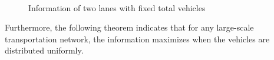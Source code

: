 \documentclass[preprint,authoryear,12pt]{elsarticle}
\begin{document}
\begin{figure}[ht]
  \centering
  \\
  \caption{Information of two lanes with fixed total vehicles}
  \label{fig:info_twolane}
\end{figure}

Furthermore, the following theorem indicates that for any large-scale transportation network, the information maximizes when the vehicles are distributed uniformly.
\end{document}
